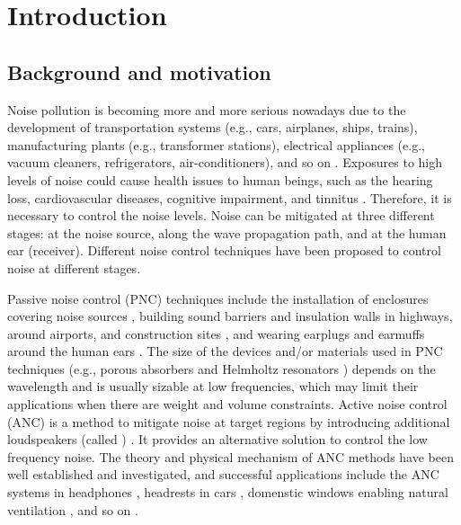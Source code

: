 \chapter{Introduction} %
\label{chap:intro} %


\section{Background and motivation}
Noise pollution is becoming more and more serious nowadays due to the development of transportation systems (e.g., cars, airplanes, ships, trains), manufacturing plants (e.g., transformer stations), electrical appliances (e.g., vacuum cleaners, refrigerators, air-conditioners), and so on \cite{Hogan1973RelationshipHighwayPlanning}. 
    Exposures to high levels of noise could cause health issues to human beings, such as the hearing loss, cardiovascular diseases, cognitive impairment, and tinnitus \cite{WorldHealthOrganization2011BurdenDiseaseEnvironmental, Munzel2014CardiovascularEffectsEnvironmental}.
    Therefore, it is necessary to control the noise levels.
Noise can be mitigated at three different stages: at the noise source, along the wave propagation path, and at the human ear (receiver). 
Different noise control techniques have been proposed to control noise at different stages.

Passive noise control (PNC) techniques include the installation of enclosures covering noise sources \cite{2000ISO156672000, 2009ISO1154612009}, building sound barriers and insulation walls in highways, around airports, and construction sites \cite{Kurze1974NoiseReductionBarriers, Tong2015FullScaleField}, and wearing earplugs and earmuffs around the human ears \cite{Gerges2012EarmuffComfort}. 
    The size of the devices and/or materials used in PNC techniques (e.g., porous absorbers \cite{Allard2009PropagationSoundPorous, Padhye2016AcousticTextiles} and Helmholtz resonators \cite{Cai2016NoiseControlZone}) depends on the wavelength and is usually sizable at low frequencies, which may limit their applications when there are weight and volume constraints.
    Active noise control (ANC) is a method to mitigate noise at target regions by introducing additional loudspeakers (called ) \cite{Nelson1992ActiveControlSound, Qiu2019IntroductionVirtualSound}.
It provides an alternative solution to control the low frequency noise.
The theory and physical mechanism of ANC methods have been well established and investigated, and successful applications include the ANC systems in headphones \cite{Ang2017PerformanceActiveNoisecanceling}, headrests in cars \cite{Jung2018EstimationPressureListener, Elliott2018HeadTrackingExtends}, domenstic windows enabling natural ventilation \cite{Lam2019ActiveControlNoise, Lam2020ActiveControlBroadband}, and so on \cite{Lam2021TenQuestionsConcerning}.


